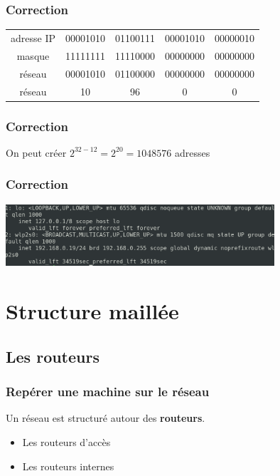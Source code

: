 \documentclass[svgnames,11pt]{beamer}
\begin{document}
\begin{frame}
    \frametitle{Correction}

    \begin{center}
        \begin{tabular}{ccccc}
            adresse IP & 00001010 & 01100111 & 00001010 & 00000010 \\
            masque     & 11111111 & 11110000 & 00000000 & 00000000 \\
            réseau     & 00001010 & 01100000 & 00000000 & 00000000 \\
            réseau     & 10 & 96 & 0 & 0 \\
        \end{tabular}
    \end{center}

\end{frame}

\begin{frame}
    \frametitle{Correction}

    On peut créer $2^{32-12}=2^{20} = 1048576$ adresses

\end{frame}
\begin{frame}
    \frametitle{Correction}

    \begin{center}
        \centering
        \includegraphics[width=10cm]{ressources/ip.png}
        \label{IMG}
    \end{center}
\end{frame}
\section{Structure maillée}
\subsection{Les routeurs}
\begin{frame}
    \frametitle{Repérer une machine sur le réseau}

    Un réseau est structuré autour des \textbf{routeurs}.
\begin{itemize}
    \item<1-> Les routeurs d'accès
    \item<2-> Les routeurs internes
\end{itemize}

\end{frame}
\end{document}
